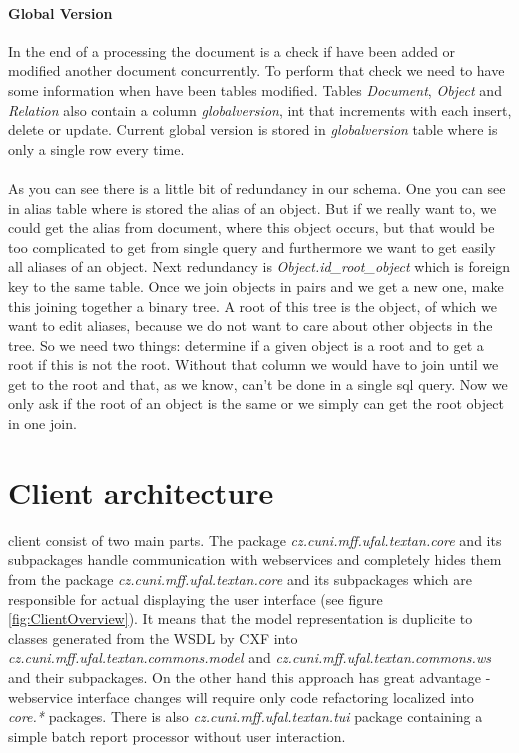 \paragraph{Global Version} In the end of a processing the document is a check if have been added 
or modified another document concurrently. To perform that check we need to have some information
when have been tables modified. Tables \emph{Document}, \emph{Object} and \emph{Relation} also 
contain a column \emph{globalversion}, int that increments with each insert, delete or update. 
Current global version is stored in \emph{globalversion} table where is only a single row every time.

\paragraph{} As you can see there is a little bit of redundancy in our schema. One you can see in alias table where is stored the alias of an object. But if we really want to, we could get the alias from document, where this object occurs, but that would be too complicated to get from single query and furthermore we want to get easily all aliases of an object.
Next redundancy is \emph{Object.id\_{}root\_{}object} which is foreign key to the same table. Once we join objects in pairs and we get a new one, make this joining together a binary tree. A root of this tree is the object, of which we want to edit aliases, because we do not want to care about other objects in the tree. So we need two things: determine if a given object is a root and to get a root if this is not the root. Without that column we would have to join until we get to the root and that, as we know, can't be done in a single sql query. Now we only ask if the root of an object is the same or we simply can get the root object in one join.

\section{Client architecture}



\textan{} client consist of two main parts. The package
\emph{cz.cuni.mff.ufal.textan.core} and its subpackages handle communication
with webservices and completely hides them from the package
\emph{cz.cuni.mff.ufal.textan.core} and its subpackages which are responsible
for actual displaying the user interface (see figure \ref{fig:ClientOverview}).
It means that the model representation is duplicite to classes generated from
the WSDL by CXF into \emph{cz.\-cuni.\-mff.\-ufal.\-textan.\-commons.\-model}
and \emph{cz.\-cuni.\-mff.\-ufal.\-textan.\-commons.\-ws} and their subpackages.
On the other hand this approach has great advantage - webservice interface
changes will require only code refactoring localized into \emph{core.*}
packages. There is also \emph{cz.\-cuni.\-mff.\-ufal.\-textan.\-tui} package
containing a simple batch report processor without user interaction.

